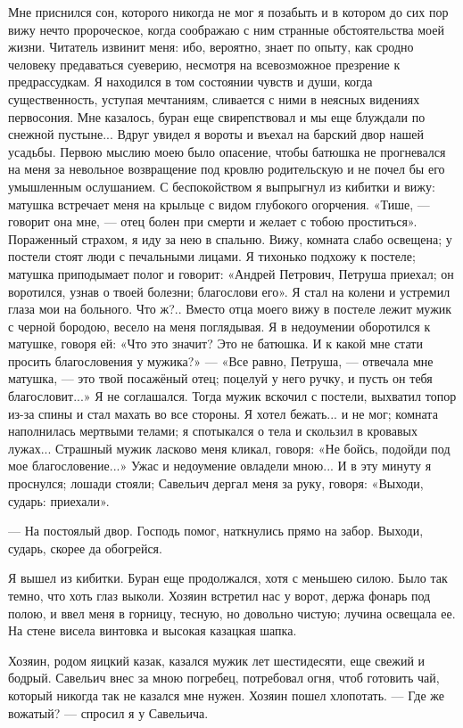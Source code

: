 Мне приснился сон, которого никогда не мог я позабыть и в котором до сих пор вижу нечто пророческое, когда соображаю с ним странные обстоятельства моей жизни. Читатель извинит меня: ибо, вероятно, знает по опыту, как сродно человеку предаваться суеверию, несмотря на всевозможное презрение к предрассудкам.
Я находился в том состоянии чувств и души, когда существенность, уступая мечтаниям, сливается с ними в неясных видениях первосония. Мне казалось, буран еще свирепствовал и мы еще блуждали по снежной пустыне... Вдруг увидел я вороты и въехал на барский двор нашей усадьбы. Первою мыслию моею было опасение, чтобы батюшка не прогневался на меня за невольное возвращение под кровлю родительскую и не почел бы его умышленным ослушанием. С беспокойством я выпрыгнул из кибитки и вижу: матушка встречает меня на крыльце с видом глубокого огорчения. «Тише, — говорит она мне, — отец болен при смерти и желает с тобою проститься». Пораженный страхом, я иду за нею в спальню. Вижу, комната слабо освещена; у постели стоят люди с печальными лицами. Я тихонько подхожу к постеле; матушка приподымает полог и говорит: «Андрей Петрович, Петруша приехал; он воротился, узнав о твоей болезни; благослови его». Я стал на колени и устремил глаза мои на больного. Что ж?.. Вместо отца моего вижу в постеле лежит мужик с черной бородою, весело на меня поглядывая. Я в недоумении оборотился к матушке, говоря ей: «Что это значит? Это не батюшка. И к какой мне стати просить благословения у мужика?» — «Все равно, Петруша, — отвечала мне матушка, — это твой посажёный отец; поцелуй у него ручку, и пусть он тебя благословит...» Я не соглашался. Тогда мужик вскочил с постели, выхватил топор из-за спины и стал махать во все стороны. Я хотел бежать... и не мог; комната наполнилась мертвыми телами; я спотыкался о тела и скользил в кровавых лужах... Страшный мужик ласково меня кликал, говоря: «Не бойсь, подойди под мое благословение...» Ужас и недоумение овладели мною... И в эту минуту я проснулся; лошади стояли; Савельич дергал меня за руку, говоря: «Выходи, сударь: приехали».

— На постоялый двор. Господь помог, наткнулись прямо на забор. Выходи, сударь, скорее да обогрейся.

Я вышел из кибитки. Буран еще продолжался, хотя с меньшею силою. Было так темно, что хоть глаз выколи. Хозяин встретил нас у ворот, держа фонарь под полою, и ввел меня в горницу, тесную, но довольно чистую; лучина освещала ее. На стене висела винтовка и высокая казацкая шапка.

Хозяин, родом яицкий казак, казался мужик лет шестидесяти, еще свежий и бодрый. Савельич внес за мною погребец, потребовал огня, чтоб готовить чай, который никогда так не казался мне нужен. Хозяин пошел хлопотать.
— Где же вожатый? — спросил я у Савельича.

